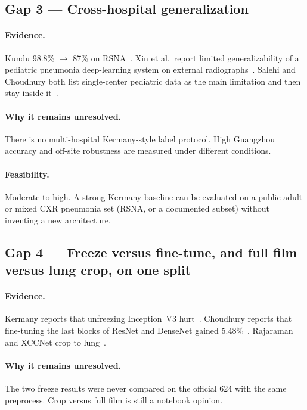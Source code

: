 \documentclass[11pt,a4paper]{article}
\begin{document}
\subsection{Gap 3 --- Cross-hospital generalization}
\paragraph{Evidence.}
Kundu 98.8\% $\rightarrow$ 87\% on RSNA~\cite{kundu2021}. Xin et al.\ report limited generalizability of a pediatric pneumonia deep-learning system on external radiographs~\cite{xin2021}. Salehi and Choudhury both list single-center pediatric data as the main limitation and then stay inside it~\cite{salehi2021,choudhury2026}.

\paragraph{Why it remains unresolved.}
There is no multi-hospital Kermany-style label protocol. High Guangzhou accuracy and off-site robustness are measured under different conditions.

\paragraph{Feasibility.}
Moderate-to-high. A strong Kermany baseline can be evaluated on a public adult or mixed CXR pneumonia set (RSNA, or a documented subset) without inventing a new architecture.

\subsection{Gap 4 --- Freeze versus fine-tune, and full film versus lung crop, on one split}
\paragraph{Evidence.}
Kermany reports that unfreezing Inception~V3 hurt~\cite{kermany2018}. Choudhury reports that fine-tuning the last blocks of ResNet and DenseNet gained 5.48\%~\cite{choudhury2026}. Rajaraman and XCCNet crop to lung~\cite{rajaraman2018,raghaw2024}.

\paragraph{Why it remains unresolved.}
The two freeze results were never compared on the official 624 with the same preprocess. Crop versus full film is still a notebook opinion.
\end{document}
